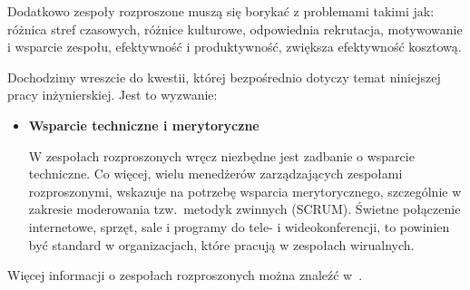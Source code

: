 Dodatkowo zespoły rozproszone muszą się borykać z problemami takimi jak: różnica stref czasowych,
różnice kulturowe, odpowiednia rekrutacja, motywowanie i wsparcie zespołu, efektywność i produktywność,
zwiększa efektywność kosztową.

Dochodzimy wreszcie do kwestii, której bezpośrednio dotyczy temat niniejszej pracy inżynierskiej.
Jest to wyzwanie:

\begin{itemize}
	\item \textbf{Wsparcie techniczne i merytoryczne}

	W zespołach rozproszonych wręcz niezbędne jest zadbanie o wsparcie techniczne.
	Co więcej, wielu menedżerów zarządzających zespołami rozproszonymi,
	wskazuje na potrzebę wsparcia merytorycznego,
	szczególnie w zakresie moderowania tzw.\ metodyk zwinnych (SCRUM).
	Świetne połączenie internetowe,	sprzęt, sale i programy do tele- i wideokonferencji,
	to powinien być standard w organizacjach, które pracują w zespołach wirualnych.
\end{itemize}


Więcej informacji o zespołach rozproszonych można znaleźć w~\cite{www_rozproszony}.

